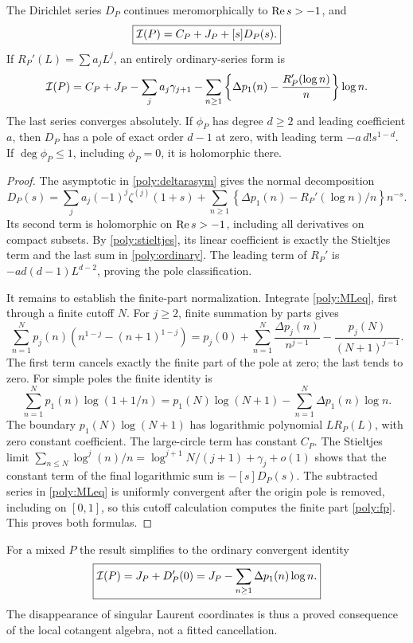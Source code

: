\begin{theorem}
\label{poly:bridge}
The Dirichlet series $D_P$ continues meromorphically to $\operatorname{Re} s>-1$,
and
\begin{equation}\label{poly:bridgeeq}
 \boxed{\mathcal I(P)=C_P+J_P+[s]D_P(s).}
\end{equation}
If $R_P'(L)=\sum a_jL^j$, an entirely ordinary-series form is
\begin{equation}\label{poly:ordinary}
 \mathcal I(P)=C_P+J_P-\sum_j a_j\gamma_{j+1}
 -\sum_{n\ge1}
 \left\{\Delta p_1(n)-\frac{R_P'(\log n)}n\right\}\log n.
\end{equation}
The last series converges absolutely. If $\phi_P$ has degree $d\ge2$
and leading coefficient $a$, then $D_P$ has a pole of exact order
$d-1$ at zero, with leading term $-a\,d!s^{1-d}$. If
$\deg\phi_P\le1$, including $\phi_P=0$, it is holomorphic there.
\end{theorem}

\begin{proof}
The asymptotic in \eqref{poly:deltarasym} gives the normal decomposition
\[
 D_P(s)=\sum_j a_j(-1)^j\zeta^{(j)}(1+s)
 +\sum_{n\ge1}
 \left\{\Delta p_1(n)-R_P'(\log n)/n\right\}n^{-s}.
\]
Its second term is holomorphic on $\operatorname{Re} s>-1$, including all derivatives
on compact subsets. By \eqref{poly:stieltjes}, its linear coefficient
is exactly the Stieltjes term and the last sum in
\eqref{poly:ordinary}. The leading term of $R_P'$ is
$-a d(d-1)L^{d-2}$, proving the pole classification.

It remains to establish the finite-part normalization. Integrate
\eqref{poly:MLeq}, first through a finite cutoff $N$. For $j\ge2$,
finite summation by parts gives
\[
 \sum_{n=1}^Np_j(n)(n^{1-j}-(n+1)^{1-j})
 =p_j(0)+\sum_{n=1}^N\frac{\Delta p_j(n)}{n^{j-1}}
   -\frac{p_j(N)}{(N+1)^{j-1}}.
\]
The first term cancels exactly the finite part of the pole at zero;
the last tends to zero. For simple poles the finite identity is
\[
 \sum_{n=1}^Np_1(n)\log(1+1/n)
 =p_1(N)\log(N+1)-\sum_{n=1}^N\Delta p_1(n)\log n.
\]
The boundary $p_1(N)\log(N+1)$ has logarithmic polynomial
$L R_P(L)$, with zero constant coefficient. The large-circle term
has constant $C_P$. The Stieltjes limit
$\sum_{n\le N}\log^j(n)/n
=\log^{j+1}N/(j+1)+\gamma_j+o(1)$ shows that the constant term of
the final logarithmic sum is $-[s]D_P(s)$. The subtracted series in
\eqref{poly:MLeq} is uniformly convergent after the origin pole is
removed, including on $[0,1]$, so this cutoff calculation computes the
finite part \eqref{poly:fp}. This proves both formulas.
\end{proof}

For a mixed $P$ the result simplifies to the ordinary convergent identity
\begin{equation}\label{poly:mixed}
 \boxed{\mathcal I(P)=J_P+D_P'(0)
       =J_P-\sum_{n\ge1}\Delta p_1(n)\log n.}
\end{equation}
The disappearance of singular Laurent coordinates is thus a proved
consequence of the local cotangent algebra, not a fitted cancellation.
